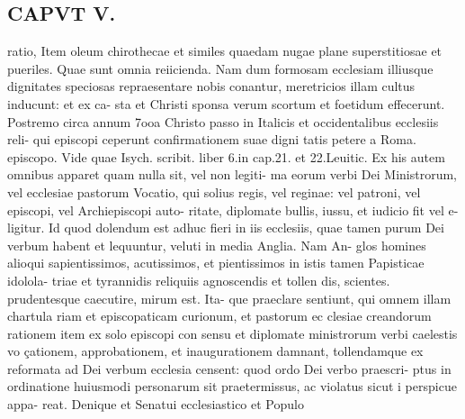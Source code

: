 \documentclass{article}
\begin{document}
\begin{pages}
\section*{CAPVT  V. }
\marginpar{[ p.363 ]}\pstart ratio, Item oleum chirothecae et similes quaedam nugae plane superstitiosae et pueriles. Quae sunt omnia reiicienda. Nam dum formosam ecclesiam illiusque dignitates speciosas repraesentare nobis conantur, meretricios illam cultus inducunt: et ex ca- sta et Christi sponsa verum scortum et foetidum effecerunt. Postremo circa annum 7ooa Christo passo in Italicis et occidentalibus ecclesiis reli- qui episcopi ceperunt confirmationem suae digni tatis petere a Roma. episcopo. Vide quae Isych. scribit. liber 6.in cap.21. et 22.Leuitic. Ex his autem omnibus apparet quam nulla sit, vel non legiti- ma eorum verbi Dei Ministrorum, vel ecclesiae pastorum Vocatio, qui solius regis, vel reginae: vel patroni, vel episcopi, vel Archiepiscopi auto- ritate, diplomate bullis, iussu, et iudicio fit vel e- ligitur. Id quod dolendum est adhuc fieri in iis ecclesiis, quae tamen purum Dei verbum habent et lequuntur, veluti in media Anglia. Nam An- glos homines alioqui sapientissimos, acutissimos, et pientissimos in istis tamen Papisticae idolola- triae et tyrannidis reliquiis agnoscendis et tollen dis, scientes. prudentesque caecutire, mirum est. Ita- que praeclare sentiunt, qui omnem illam chartula riam et episcopaticam curionum, et pastorum ec clesiae creandorum rationem item ex solo episcopi con sensu et diplomate ministrorum verbi caelestis vo çationem, approbationem, et inaugurationem damnant, tollendamque  ex reformata ad Dei verbum ecclesia censent: quod ordo Dei verbo praescri- ptus in ordinatione huiusmodi personarum sit praetermissus, ac violatus sicut i perspicue appa- reat. Denique et Senatui ecclesiastico et Populo  \pend

\end{pages}
\end{document}
